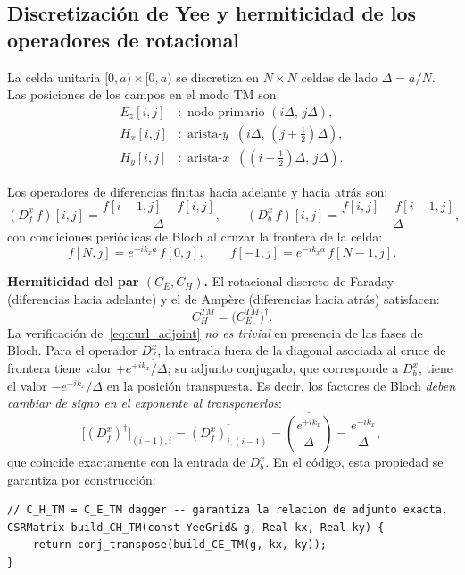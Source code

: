 \documentclass[12pt,a4paper]{article}
\newcommand{\conj}[1]{\overline{#1}}
\begin{document}
\subsection{Discretización de Yee y hermiticidad de los operadores de rotacional}

\label{sec:yee}

La celda unitaria $[0,a)\times[0,a)$ se discretiza en $N\times N$ celdas
de lado $\Delta = a/N$.
Las posiciones de los campos en el modo TM son:
\begin{align*}
  E_z[i,j] &: \text{ nodo primario } (i\Delta,\, j\Delta),\\
  H_x[i,j] &: \text{ arista-}y \;\; (i\Delta,\, (j+\tfrac{1}{2})\Delta),\\
  H_y[i,j] &: \text{ arista-}x \;\; ((i+\tfrac{1}{2})\Delta,\, j\Delta).
\end{align*}

Los operadores de diferencias finitas hacia adelante y hacia atrás son:
\begin{equation}
  (D_f^x\, f)[i,j] = \frac{f[i+1,j] - f[i,j]}{\Delta},
  \qquad
  (D_b^x\, f)[i,j] = \frac{f[i,j] - f[i-1,j]}{\Delta},
  \label{eq:Dfx}
\end{equation}
con condiciones periódicas de Bloch al cruzar la frontera de la celda:
\begin{equation}
  f[N,j] = e^{+ik_x a}\, f[0,j], \qquad
  f[-1,j] = e^{-ik_x a}\, f[N-1,j].
  \label{eq:bloch}
\end{equation}

\textbf{Hermiticidad del par $(C_E, C_H)$.}
El rotacional discreto de Faraday (diferencias hacia adelante) y el de
Ampère (diferencias hacia atrás) satisfacen:
\begin{equation}
  C_H^{TM} = \bigl(C_E^{TM}\bigr)^\dagger.
  \label{eq:curl_adjoint}
\end{equation}
La verificación de~\eqref{eq:curl_adjoint} \emph{no es trivial} en
presencia de las fases de Bloch.
Para el operador $D_f^x$, la entrada fuera de la diagonal asociada al
cruce de frontera tiene valor $+e^{+ik_x}/\Delta$;
su adjunto conjugado, que corresponde a $D_b^x$, tiene el valor
$-e^{-ik_x}/\Delta$ en la posición transpuesta.
Es decir, los factores de Bloch \emph{deben cambiar de signo en el
exponente al transponerlos}:
\begin{equation}
  \bigl[(D_f^x)^\dagger\bigr]_{(i-1),i}
    = \conj{(D_f^x)_{i,(i-1)}}
    = \conj{\!\left(\frac{e^{+ik_x}}{\Delta}\right)\!}
    = \frac{e^{-ik_x}}{\Delta},
  \label{eq:bloch_conj}
\end{equation}
que coincide exactamente con la entrada de $D_b^x$.
En el código, esta propiedad se garantiza por construcción:
\begin{lstlisting}[style=cpp, caption={Construcción del adjunto exacto en \texttt{operators.cpp}}]
// C_H_TM = C_E_TM dagger -- garantiza la relacion de adjunto exacta.
CSRMatrix build_CH_TM(const YeeGrid& g, Real kx, Real ky) {
    return conj_transpose(build_CE_TM(g, kx, ky));
}
\end{lstlisting}
\end{document}
